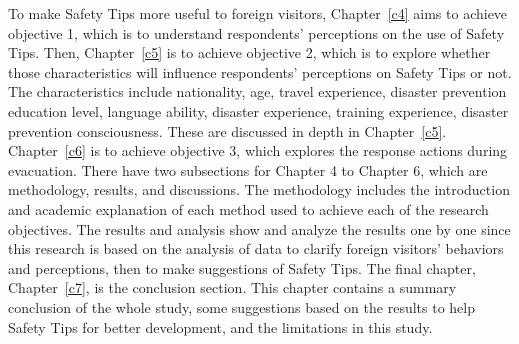 To make Safety Tips more useful to foreign visitors, Chapter~\ref{c4} aims to achieve objective 1, which is to understand respondents' perceptions on the use of Safety Tips. Then, Chapter~\ref{c5} is to achieve objective 2, which is to explore whether those characteristics will influence respondents'  perceptions on Safety Tips or not. The characteristics include nationality, age, travel experience, disaster prevention education level, language ability, disaster experience, training experience, disaster prevention consciousness. These are discussed in depth in Chapter~\ref{c5}. Chapter~\ref{c6} is to achieve objective 3, which explores the response actions during evacuation. There have two subsections for Chapter 4 to Chapter 6, which are methodology, results, and discussions. The methodology includes the introduction and academic explanation of each method used to achieve each of the research objectives. The results and analysis show and analyze the results one by one since this research is based on the analysis of data to clarify foreign visitors' behaviors and perceptions, then to make suggestions of Safety Tips. The final chapter, Chapter~\ref{c7}, is the conclusion section. This chapter contains a summary conclusion of the whole study, some suggestions based on the results to help Safety Tips for better development, and the limitations in this study.




